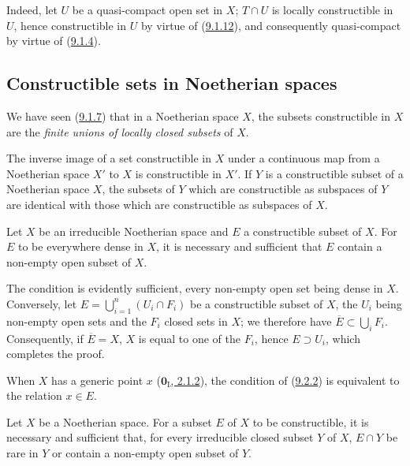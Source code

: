 Indeed, let $U$ be a quasi-compact open set in $X$; $T\cap U$ is
locally constructible in $U$, hence constructible in $U$ by virtue of
(\hyperref[0.9.1.12]{9.1.12}), and consequently quasi-compact by virtue of
(\hyperref[0.9.1.4]{9.1.4}).

\subsection{Constructible sets in Noetherian spaces}
\label{subsection:0.9.2}

\begin{env}[9.2.1]
\label{0.9.2.1}
We have seen (\hyperref[0.9.1.7]{9.1.7}) that in a Noetherian space $X$, the
subsets constructible in $X$ are the \emph{finite unions of locally
closed subsets} of $X$.

The inverse image of a set constructible in $X$ under a continuous
map from a Noetherian space $X'$ to $X$ is constructible in $X'$.
If $Y$ is a constructible subset of a Noetherian space $X$, the subsets
of $Y$ which are constructible as subspaces of $Y$ are
identical with those which are constructible as subspaces of $X$.
\end{env}

\begin{proposition}[9.2.2]
\label{0.9.2.2}
Let $X$ be an irreducible Noetherian space and $E$ a constructible subset of
$X$. For $E$ to be everywhere dense in $X$, it is necessary and sufficient
that $E$ contain a non-empty open subset of $X$.
\end{proposition}

The condition is evidently sufficient, every non-empty open set being
dense in $X$. Conversely, let
$E=\bigcup_{i=1}^n(U_i\cap F_i)$ be a constructible subset of $X$, the $U_i$
being non-empty open sets and the $F_i$ closed sets in $X$; we therefore have
$\overline{E}\subset\bigcup_i F_i$. Consequently, if $\overline{E}=X$, $X$ is
equal to one of the $F_i$, hence $E\supset U_i$, which completes the proof.

When $X$ has a generic point $x$
(\hyperref[0.2.1.2]{$\mathbf{0}_{\mathrm I}$, 2.1.2}), the condition of
(\hyperref[0.9.2.2]{9.2.2}) is equivalent to the relation $x\in E$.

\begin{proposition}[9.2.3]
\label{0.9.2.3}
Let $X$ be a Noetherian space. For a subset $E$ of $X$ to be
constructible, it is necessary and sufficient that, for every irreducible
closed subset $Y$ of $X$, $E\cap Y$ be rare in $Y$ or contain a
non-empty open subset of $Y$.
\end{proposition}

